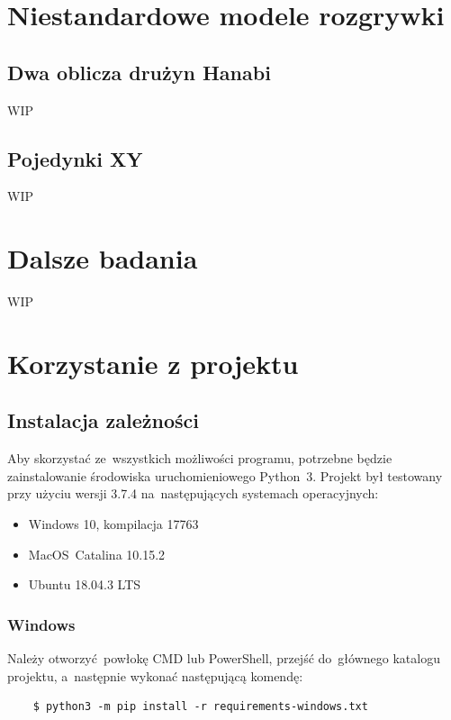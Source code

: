 \documentclass[declaration,shortabstract,inz]{iithesis}
\begin{document}
\chapter{Niestandardowe modele rozgrywki}

\section{Dwa oblicza drużyn Hanabi}

WIP

\section{Pojedynki XY}

WIP

\chapter{Dalsze badania}

WIP

\appendix
\chapter{Korzystanie z projektu}

\section{Instalacja zależności}
Aby skorzystać ze~wszystkich możliwości programu, potrzebne będzie zainstalowanie środowiska uruchomieniowego Python~3. Projekt był testowany przy użyciu wersji 3.7.4 na~następujących systemach operacyjnych:
\begin{itemize}
	\item Windows 10, kompilacja 17763
	\item MacOS~Catalina 10.15.2
	\item Ubuntu 18.04.3 LTS
\end{itemize}

\subsection{Windows}

Należy otworzyć powłokę CMD lub PowerShell, przejść do~głównego katalogu projektu, a~następnie wykonać następującą komendę:
\begin{verbatim}
    $ python3 -m pip install -r requirements-windows.txt
\end{verbatim}
\end{document}
